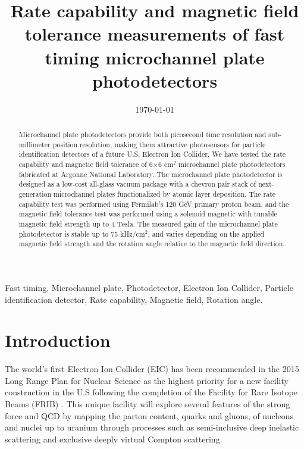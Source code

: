 \documentclass[preprint,5p]{elsarticle}
\title{\vspace{-15mm}\fontsize{18pt}{10pt}\selectfont\textbf{Rate capability 
and magnetic field tolerance measurements of fast timing microchannel plate 
photodetectors}}
\date{\today}
\begin{document}
\begin{abstract}
Microchannel plate photodetectors provide both picosecond time resolution and 
sub-millimeter position resolution, making them attractive photosensors for 
particle identification detectors of a future U.S. Electron Ion Collider. We 
have tested the rate capability and magnetic field tolerance of 6$\times$6 
cm$^{2}$ microchannel plate photodetectors fabricated at Argonne National 
Laboratory. The microchannel plate photodetector is designed as a low-cost 
all-glass vacuum package with a chevron pair stack of next-generation 
microchannel plates functionalized by atomic layer deposition. The rate 
capability test was performed using Fermilab's 120 GeV primary proton beam, and 
the magnetic field tolerance test was performed using a solenoid magnetic with 
tunable magnetic field strength up to 4 Tesla. The measured gain of the 
microchannel plate photodetector is stable up to 75 kHz/cm$^{2}$, and varies 
depending on the applied magnetic field strength and the rotation angle 
relative to the magnetic field direction.
\end{abstract}

\maketitle

\begin{keywords}
   Fast timing, Microchannel plate, Photodetector, Electron Ion Collider, 
   Particle identification detector, Rate capability, Magnetic field, Rotation 
   angle.
\end{keywords}


\section{Introduction} \label{sec:level1}
The world's first Electron Ion Collider (EIC) \cite{EIC} has been recommended
in the 2015 Long Range Plan for Nuclear Science as the highest priority for a 
new facility construction in the U.S following the completion of the Facility 
for Rare Isotope Beams (FRIB) \cite{LRP}. This unique facility will explore 
several features of the strong force and QCD by mapping the parton content, 
quarks and gluons, of nucleons and nuclei up to uranium through processes such 
as semi-inclusive deep inelastic scattering and exclusive deeply virtual 
Compton scattering.  
\end{document}
